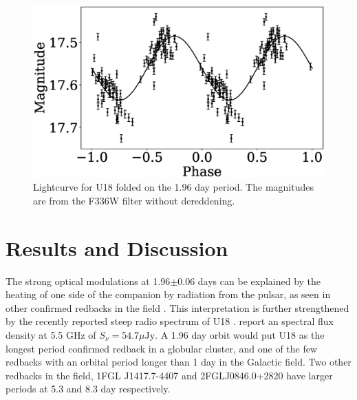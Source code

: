 \documentclass[fleqn,usenatbib,useAMS,letters]{mnras}
\begin{document}



 \begin{figure}
	\includegraphics[width =\columnwidth]{folded.eps}
	\vspace{-0.5 cm}
    \caption{Lightcurve for U18 folded on the 1.96 day period. The magnitudes are from the F336W filter without dereddening. }
    \label{fig:folded}
\end{figure}

 
 \section{Results and Discussion}
 

 
 The strong optical modulations at 1.96$\pm$0.06 days can be explained by the heating of one side of the companion by radiation from the pulsar, as seen in other confirmed redbacks in the field \citep[e.g.,][]{Hui2015PSR2219,salvetti2015J2039}.  This interpretation is further strengthened by the recently reported steep radio spectrum of U18 \citep{CoryPaper}. \citet{CoryPaper} report an spectral flux density at 5.5 GHz of $S_\nu =54.7 \mu\text{Jy}$. A 1.96 day orbit would put U18 as the longest period confirmed redback in a globular cluster, and one of the few redbacks with an orbital period longer than 1 day in the Galactic field. Two other redbacks in the field, 1FGL J1417.7-4407 \citep{Strader2015,Camilo2016,Swihart2018} and 2FGLJ0846.0+2820 \citep{Swihart2017} have larger periods at 5.3 and 8.3 day respectively. %
 
\end{document}

